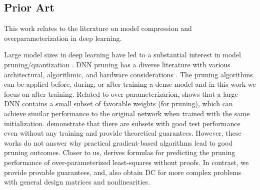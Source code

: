 \subsection{Prior Art}
This work relates to the literature on model compression and overparameterization in deep learning. 

\vs{} Large model sizes in deep learning have led to a substantial interest in model pruning/quantization \cite{han2015deep,hassibi1993second,lecun1990optimal}. DNN pruning has a diverse literature with various architectural, algorithmic, and hardware considerations \cite{sze2017efficient,han2015learning}. The pruning algorithms can be applied before, during, or after training a dense model \cite{lee2018snip,wang2020picking,jin2016training,oymak2018learning} and in this work we focus on after training. Related to over-parameterizarion, \cite{frankle2018lottery} shows that a large DNN contains a small subset of favorable weights (for pruning), which can achieve similar performance to the original network when trained with the same initialization. \cite{zhou2019deconstructing,malach2020proving,pensia2020optimal} demonstrate that there are subsets with good test performance even without any training and provide theoretical guarantees. However, these works do not answer why practical gradient-based algorithms lead to good pruning outcomes. {Closer to us, \cite{li2020exploring} derives formulas for predicting the pruning performance of over-parameterized least-squares without proofs. In contrast, we provide provable guarantees, and, also obtain DC for more complex problems with general design matrices and nonlinearities.}


